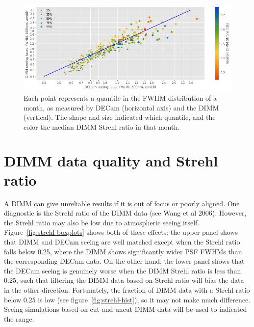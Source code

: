 \documentclass[\docopts]{\docclass}
\begin{document}
\begin{figure}
  \includegraphics[width=\columnwidth]{dimm_vs_decam.png}
  \caption{
    Each point represents a quantile in the FWHM distribution of a
    month, as measured by DECam (horizontal axis) and the DIMM
    (vertical). The shape and size indicated which quantile, and the
    color the median DIMM Strehl ratio in that month.
    }
  \label{fig:dimm-vs-decam}
\end{figure}

\section{DIMM data quality and Strehl ratio}

A DIMM can give unreliable results if it is out of focus or poorly
aligned. One diagnostic is the Strehl ratio of the DIMM data (see Wang
et al 2006). However, the Strehl ratio may also be low due to
atmospheric seeing itself. Figure~\ref{fig:strehl-boxplots} shows both
of these effects: the upper panel shows that DIMM and DECam seeing are
well matched except when the Strehl ratio falls below 0.25, where the
DIMM shows significantly wider PSF FWHMs than the corresponding DECam
data. On the other hand, the lower panel shows that the DECam seeing
is genuinely worse when the DIMM Strehl ratio is less than 0.25, such
that filtering the DIMM data based on Strehl ratio will bias the data
in the other direction. Fortunately, the fraction of DIMM data with a
Strehl ratio below 0.25 is low (see figure~\ref{fig:strehl-hist}), so
it may not make much difference. Seeing simulations based on cut and
uncut DIMM data will be used to indicated the range.
\end{document}

